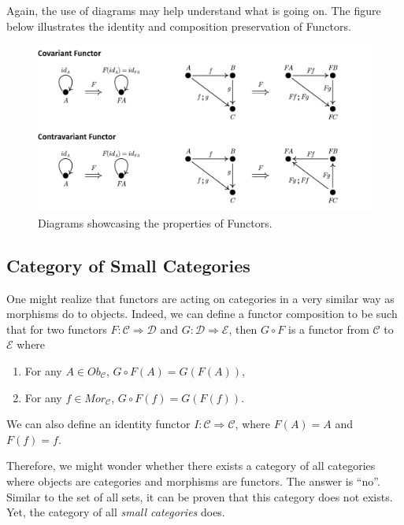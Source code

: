 Again, the use of diagrams may help understand what is going on. The figure below
illustrates the identity and composition preservation of Functors.

\begin{figure}[H]
  \begin{center}
    \includegraphics[width=1.1\textwidth]{./notebooks/Functor.pdf}
  \end{center}
  \caption{Diagrams showcasing the properties of Functors.}
  \label{fig:Functor}
\end{figure}

\subsection{Category of Small Categories}

One might realize that functors are acting on categories in a very similar way as morphisms
do to objects. Indeed, we can define a functor composition to be
such that for two functors $F:\mathcal C \Rightarrow \mathcal D$
and $G:\mathcal D \Rightarrow \mathcal E$, then $G \circ F$ is
a functor from $\mathcal C$ to $\mathcal E$ where
\begin{enumerate}
  \item For any $A \in Ob_\mathcal C$, $G\circ F (A) = G(F(A))$,
  \item For any $f \in Mor_\mathcal C$, $G\circ F (f) = G(F(f))$.
\end{enumerate}
We can also define an identity functor $I:\mathcal C \Rightarrow \mathcal C$,
where $F(A) = A$ and $F(f) = f$.

Therefore, we might wonder whether there exists a category of all categories
where objects are categories and morphisms are functors.
The answer is ``no''. Similar to the set of all sets, it can be proven
that this category does not exists. Yet, the category of all \textit{small categories}
does.

